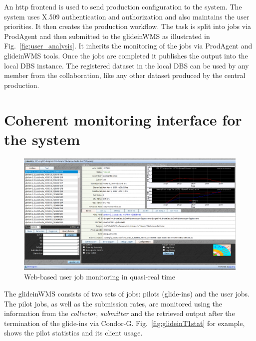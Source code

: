 \documentclass[a4paper]{jpconf}
\begin{document}
An http frontend is used to send production configuration to the system. 
The system uses X.509 authentication and authorization and also maintains the user priorities. 
It then creates the production workflow. The task is split into jobs via ProdAgent and then 
submitted to the glideinWMS as illustrated in Fig.~\ref{fig:user_analysis}. It inherits the monitoring of the 
jobs via ProdAgent and glideinWMS tools. 
Once the jobs are completed it publishes the output into the local DBS instance. The registered 
dataset in the local DBS can be used by any member from the collaboration, like any other dataset produced 
by the central production. 

\section{Coherent monitoring interface for the system}
\begin{figure}
\begin{center}
\includegraphics[scale=0.4]{jobMon.png}
\end{center}
\caption{Web-based user job monitoring in quasi-real time}
\label{fig:jobMon}
\end{figure}
The glideinWMS consists of two sets of jobs: pilots (glide-ins) and the user jobs. The
pilot jobs, as well as the submission rates, are monitored using the information from the \emph{collector},
\emph{submitter} and the retrieved output after the termination of the glide-ins via Condor-G.
Fig.~\ref{fig:glideinT1stat} for example, shows the pilot statistics and its client usage.
\end{document}
